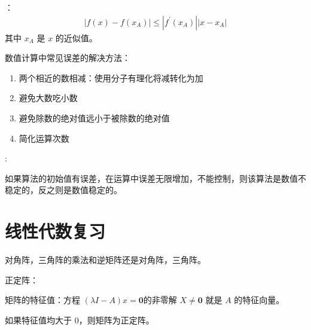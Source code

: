 ：
\begin{align*}
	|f(x) - f(x_A)| \le |f^\prime (x_A)||x - x_A|
\end{align*}
其中 $x_A$ 是 $x$ 的近似值。

数值计算中常见误差的解决方法：
\begin{enumerate}
	\item 两个相近的数相减：使用分子有理化将减转化为加
	\item 避免大数吃小数
	\item 避免除数的绝对值远小于被除数的绝对值
	\item 简化运算次数
\end{enumerate}

:

如果算法的初始值有误差，在运算中误差无限增加，不能控制，则该算法是数值不稳定的，反之则是数值稳定的。

\section{线性代数复习}

对角阵，三角阵的乘法和逆矩阵还是对角阵，三角阵。

正定阵：

矩阵的特征值：方程 $(\lambda I-A)x = \boldsymbol{0}$的非零解 $X\ne\boldsymbol{0}$ 就是 $A$ 的特征向量。

如果特征值均大于 $0$，则矩阵为正定阵。